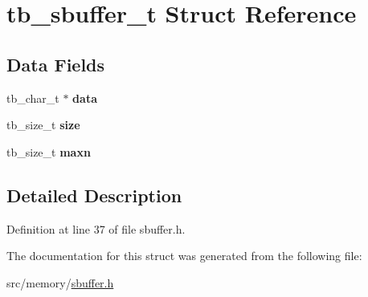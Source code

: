\hypertarget{structtb__sbuffer__t}{\section{tb\-\_\-sbuffer\-\_\-t Struct Reference}
\label{structtb__sbuffer__t}
}
\subsection*{Data Fields}
\begin{DoxyCompactItemize}
\item 
\hypertarget{structtb__sbuffer__t_ab303f0dc2e558f882bc9a00baec75d8e}{tb\-\_\-char\-\_\-t $\ast$ {\bfseries data}}\label{structtb__sbuffer__t_ab303f0dc2e558f882bc9a00baec75d8e}

\item 
\hypertarget{structtb__sbuffer__t_aeb0399442295baa696333161c8b87066}{tb\-\_\-size\-\_\-t {\bfseries size}}\label{structtb__sbuffer__t_aeb0399442295baa696333161c8b87066}

\item 
\hypertarget{structtb__sbuffer__t_a8da5020c6b84aab5c14c0466b07f1eca}{tb\-\_\-size\-\_\-t {\bfseries maxn}}\label{structtb__sbuffer__t_a8da5020c6b84aab5c14c0466b07f1eca}

\end{DoxyCompactItemize}


\subsection{Detailed Description}


Definition at line 37 of file sbuffer.\-h.



The documentation for this struct was generated from the following file\-:\begin{DoxyCompactItemize}
\item 
src/memory/\hyperlink{sbuffer_8h}{sbuffer.\-h}\end{DoxyCompactItemize}
